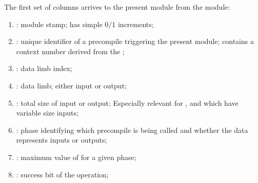The first set of columns arrives to the present module from the \mmioMod{} module:
\begin{enumerate}
      \item \blsStamp{}: %
            module stamp; has simple $0/1$ increments;
      \item \blsId{}: %
            unique identifier of a precompile  triggering the present module;
            contains a context number derived from the \hubStamp{};
      \item \blsIndex{}: %
            data limb index;
      \item \blsLimb{}: %
            data limb; either input or output;
      \item \blsTotalSize{}: %
            total size of input or output; Especially relevant for ,  and  which have variable size inputs;
      \item \blsPhase{}: %
            phase identifying which precompile is being called and whether the data represents inputs or outputs;
      \item \indexMax{}: %
            maximum value of \blsIndex{} for a given phase;
      \item \blsSuccessBit{} \hubMmuMmioBlsPrediction{} \markAsPartiallyJustifiedHere{}:
            success bit of the operation;
\end{enumerate}

